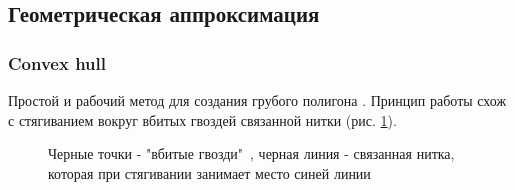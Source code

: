 \documentclass[a4paper, 14pt]{article}
\begin{document}
\subsection{Геометрическая аппроксимация} 
\subsubsection{Convex hull}
\label{convex}


Простой и рабочий метод для создания грубого полигона \cite{convex_hull}. Принцип работы схож 
с стягиванием вокруг вбитых гвоздей связанной нитки (рис. \ref{fig:convex_hull}).


\begin{figure}[h]
	\caption{Черные  точки - "вбитые гвозди"\ , черная линия - связанная нитка, которая при стягивании занимает место синей линии}
	\label{fig:convex_hull}
\end{figure}
\end{document}
